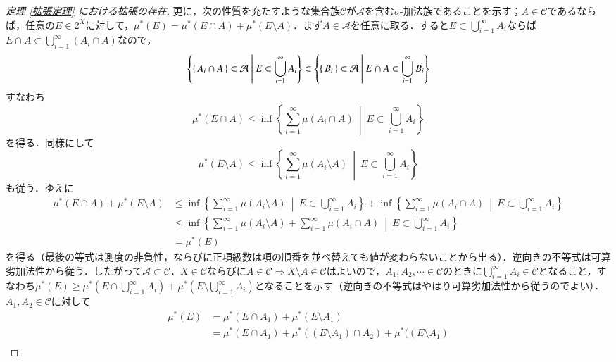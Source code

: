 \begin{proof}[定理 \ref{拡張定理} における拡張の存在]
更に，次の性質を充たすような集合族$\mathcal{C}$が$\mathcal{A}$を含む$\sigma$-加法族であることを示す；$A \in \mathcal{C}$であるならば，任意の$E \in 2^X$に対して，$\mu^*(E) = \mu^*(E \cap A) + \mu^*(E \setminus A)$．まず$A \in \mathcal{A}$を任意に取る．すると$E \subset \bigcup_{i=1}^\infty A_i$ならば$E \cap A \subset \bigcup_{i=1}^\infty (A_i \cap A)$なので，
\begin{equation}
\left\{ \set{A_i \cap A} \subset \mathcal{A} \ \middle| \  E \subset \bigcup_{i=1}^\infty A_i \right\} \subset
\left\{ \set{B_i} \subset \mathcal{A} \ \middle| \  E \cap A \subset \bigcup_{i=1}^\infty B_i \right\} 
\end{equation}すなわち
\begin{equation}
\mu^*(E \cap A) \leq \inf \left\{ \sum_{i=1}^\infty \mu(A_i \cap A) \ \middle| \  E \subset \bigcup_{i=1}^\infty A_i \right\}
\end{equation}を得る．同様にして
\begin{equation}
\mu^*(E \setminus A) \leq \inf \left\{ \sum_{i=1}^\infty \mu(A_i \setminus A) \ \middle| \  E \subset \bigcup_{i=1}^\infty A_i \right\}
\end{equation}も従う．ゆえに
\begin{align}
\mu^*(E \cap A) + \mu^*(E \setminus A) &\leq \inf \left\{ \sum_{i=1}^\infty \mu(A_i \setminus A) \ \middle| \  E \subset \bigcup_{i=1}^\infty A_i \right\} + \inf \left\{ \sum_{i=1}^\infty \mu(A_i \cap A) \ \middle| \  E \subset \bigcup_{i=1}^\infty A_i \right\} \\
&\leq \inf \left\{ \sum_{i=1}^\infty \mu(A_i \setminus A) + \sum_{i=1}^\infty \mu(A_i \cap A) \ \middle| \  E \subset \bigcup_{i=1}^\infty A_i \right\} \\
&= \mu^*(E)
\end{align}を得る（最後の等式は測度の非負性，ならびに正項級数は項の順番を並べ替えても値が変わらないことから出る）．逆向きの不等式は可算劣加法性から従う．したがって$\mathcal{A} \subset \mathcal{C}$．$X \in \mathcal{C}$ならびに$A \in \mathcal{C} \Rightarrow X \setminus A \in \mathcal{C}$はよいので，$A_1, A_2, \cdots \in \mathcal{C}$のときに$\bigcup_{i=1}^\infty A_i \in \mathcal{C}$となること，すなわち$\mu^*(E) \geq \mu^*(E \cap \bigcup_{i=1}^\infty A_i) + \mu^*(E \setminus \bigcup_{i=1}^\infty A_i)$となることを示す（逆向きの不等式はやはり可算劣加法性から従うのでよい）．$A_1, A_2 \in \mathcal{C}$に対して
\begin{align}
\mu^*(E) &= \mu^* (E \cap A_1) + \mu^*(E \setminus A_1) \\
&= \mu^*(E \cap A_1) + \mu^*((E \setminus A_1) \cap A_2) + \mu^*((E \setminus A_1)\\

\end{align}
\end{proof}
